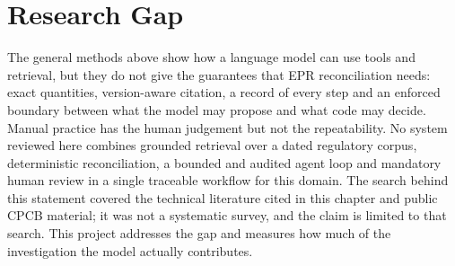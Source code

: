 \section{Research Gap}
The general methods above show how a language model can use tools and retrieval, but they do not give
the guarantees that EPR reconciliation needs: exact quantities, version-aware citation, a record of every
step and an enforced boundary between what the model may propose and what code may decide. Manual practice
has the human judgement but not the repeatability. No system reviewed here combines grounded retrieval over a
dated regulatory corpus, deterministic reconciliation, a bounded and audited agent loop and mandatory human
review in a single traceable workflow for this domain. The search behind this statement covered the
technical literature cited in this chapter and public CPCB material; it was not a systematic survey, and
the claim is limited to that search. This project addresses the gap and measures how much of the
investigation the model actually contributes.

